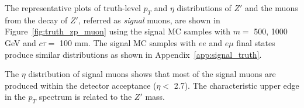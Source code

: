 The representative plots of truth-level $p_{T}$ and $\eta$ distributions of $Z'$ and the muons from the decay of $Z'$, referred as \textit{signal} muons, are shown in Figure~\ref{fig:truth_zp_muon} using the signal MC samples with $m=$ 500, 1000 GeV and $c\tau=$ 100 mm. The signal MC samples with $ee$ and $e\mu$ final states produce similar distributions as shown in Appendix~\ref{app:signal_truth}.

The $\eta$ distribution of signal muons shows that most of the signal muons are produced within the detector acceptance ($\eta <$ 2.7). The characteristic upper edge in the $p_{T}$ spectrum is related to the $Z'$ mass.


